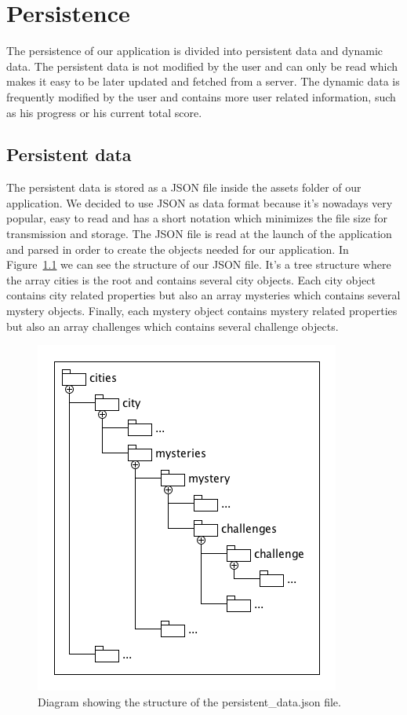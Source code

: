 \chapter{Persistence}

The persistence of our application is divided into persistent data and dynamic data. The persistent data is not modified by the user and can only be read which makes it easy to be later updated and fetched from a server. The dynamic data is frequently modified by the user and contains more user related information, such as his progress or his current total score.

\section{Persistent data}

The persistent data is stored as a JSON file inside the assets folder of our application. We decided to use JSON as data format because it's nowadays very popular, easy to read and has a short notation which minimizes the file size for transmission and storage. The JSON file is read at the launch of the application and parsed in order to create the objects needed for our application. In Figure~\ref{fig:JSONStructure} we can see the structure of our JSON file. It's a tree structure where the array cities is the root and contains several city objects. Each city object contains city related properties but also an array mysteries which contains several mystery objects. Finally, each mystery object contains mystery related properties but also an array challenges which contains several challenge objects.

\begin{figure}[H]
	\centering
	\includegraphics[scale=0.4]{Figures/JSONStructure}
	\caption{Diagram showing the structure of the persistent\_data.json file.}
	\label{fig:JSONStructure}
\end{figure}


